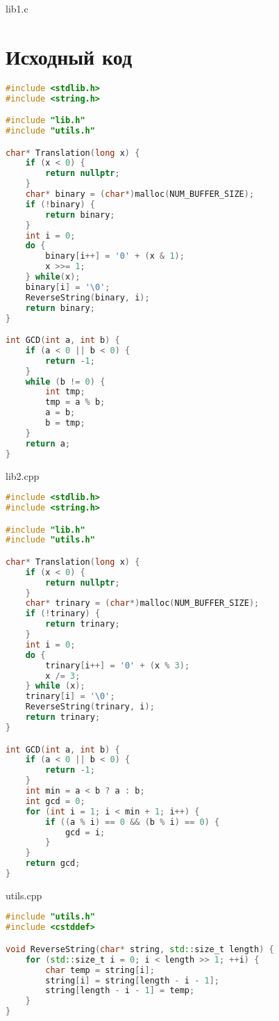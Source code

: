 \documentclass[a4paper, 12pt]{article}
\begin{document}
\newpage

lib1.c
\section{Исходный код}
\begin{lstlisting}[language=C++]
#include <stdlib.h>
#include <string.h>

#include "lib.h"
#include "utils.h"

char* Translation(long x) {
    if (x < 0) {
        return nullptr;
    }
    char* binary = (char*)malloc(NUM_BUFFER_SIZE);
    if (!binary) {
        return binary;
    }
    int i = 0;
    do {
        binary[i++] = '0' + (x & 1);
        x >>= 1;
    } while(x);
    binary[i] = '\0';
    ReverseString(binary, i);
    return binary;
}

int GCD(int a, int b) {
    if (a < 0 || b < 0) {
        return -1;
    }
    while (b != 0) {
        int tmp;
        tmp = a % b;
        a = b;
        b = tmp;
    }
    return a;
}
\end{lstlisting}

lib2.cpp
\begin{lstlisting}[language=C++]
#include <stdlib.h>
#include <string.h>

#include "lib.h"
#include "utils.h"

char* Translation(long x) {
    if (x < 0) {
        return nullptr;
    }
    char* trinary = (char*)malloc(NUM_BUFFER_SIZE);
    if (!trinary) {
        return trinary;
    }
    int i = 0;
    do {
        trinary[i++] = '0' + (x % 3);
        x /= 3;
    } while (x);
    trinary[i] = '\0';
    ReverseString(trinary, i);
    return trinary;
}

int GCD(int a, int b) {
    if (a < 0 || b < 0) {
        return -1;
    }
    int min = a < b ? a : b;
    int gcd = 0;
    for (int i = 1; i < min + 1; i++) {
        if ((a % i) == 0 && (b % i) == 0) {
            gcd = i;
        }
    }
    return gcd;
}
\end{lstlisting}

utils.cpp
\begin{lstlisting}[language=C++]
#include "utils.h"
#include <cstddef>

void ReverseString(char* string, std::size_t length) {
    for (std::size_t i = 0; i < length >> 1; ++i) {
        char temp = string[i];
        string[i] = string[length - i - 1];
        string[length - i - 1] = temp;
    }
}
\end{lstlisting}
\end{document}
